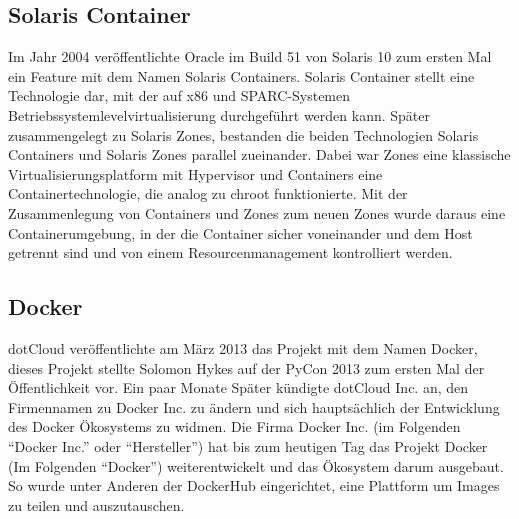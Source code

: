\subsection*{Solaris Container}
\label{sec:solariscontainer}

Im Jahr 2004 veröffentlichte Oracle im Build 51 von Solaris 10 zum ersten Mal ein Feature mit dem Namen Solaris Containers. Solaris Container stellt eine Technologie dar, mit der auf x86 und SPARC-Systemen Betriebssystemlevelvirtualisierung durchgeführt werden kann. Später zusammengelegt zu Solaris Zones, bestanden die beiden Technologien Solaris Containers und Solaris Zones parallel zueinander. Dabei war Zones eine klassische Virtualisierungsplatform mit Hypervisor und Containers eine Containertechnologie, die analog zu chroot funktionierte. Mit der Zusammenlegung von Containers und Zones zum neuen Zones wurde daraus eine Containerumgebung, in der die Container sicher voneinander und dem Host getrennt sind und von einem Resourcenmanagement kontrolliert werden.\cite{OracleZonesIntro,OracleZonesOver}
	




\subsection*{Docker}
\label{sec:Docker}


dotCloud veröffentlichte am März 2013 das Projekt mit dem Namen Docker, dieses Projekt stellte Solomon Hykes auf der PyCon 2013 zum ersten Mal der Öffentlichkeit vor. \cite{dockeryout1} Ein paar Monate Später kündigte dotCloud Inc. an, den Firmennamen zu Docker Inc. zu ändern und sich hauptsächlich der Entwicklung des Docker Ökosystems zu widmen.\cite{dockerblog} Die Firma Docker Inc. (im Folgenden "`Docker Inc."' oder "`Hersteller"') hat bis zum heutigen Tag das Projekt Docker (Im Folgenden "`Docker"') weiterentwickelt und das Ökosystem darum ausgebaut. So wurde unter Anderen der DockerHub eingerichtet, eine Plattform um Images zu teilen und auszutauschen.\cite{dockermanual}

